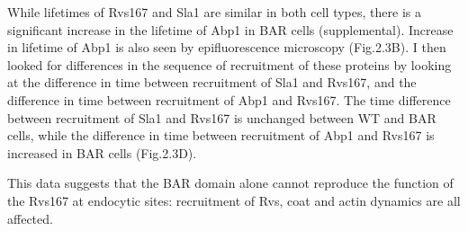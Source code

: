 	\vspace{5mm}
While lifetimes of Rvs167 and Sla1 are similar in both cell types, there is a significant increase in the lifetime of Abp1 in BAR cells (supplemental). Increase in lifetime of Abp1 is also seen by epifluorescence microscopy (Fig.2.3B). I then looked for differences in the sequence of recruitment of these proteins by looking at the difference in time between recruitment of Sla1 and Rvs167, and the difference in time between recruitment of Abp1 and Rvs167. The time difference between recruitment of Sla1 and Rvs167 is unchanged between WT and BAR cells, while the difference in time between recruitment of Abp1 and Rvs167 is increased in BAR cells (Fig.2.3D).

	\vspace{5mm}
This data suggests that the BAR domain alone cannot reproduce the function of the Rvs167 at endocytic sites: recruitment of Rvs, coat and actin dynamics are all affected. 



